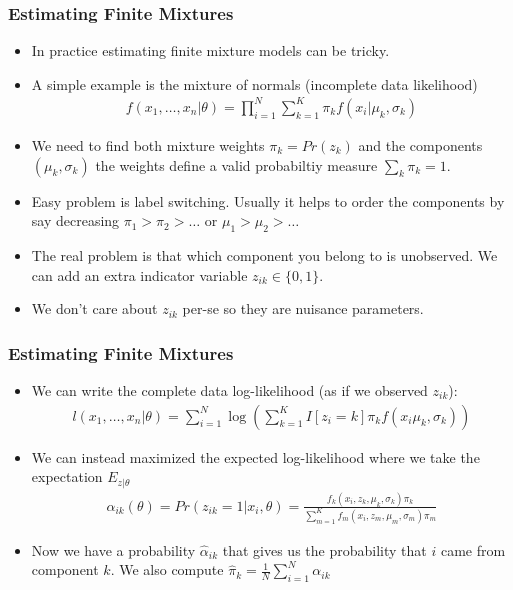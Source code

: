 \documentclass[xcolor=pdftex,dvipsnames,table,mathserif]{beamer}
\begin{document}
\begin{frame}
\frametitle{Estimating Finite Mixtures}
\begin{itemize}
\item In practice estimating finite mixture models can be tricky.
\item A simple example is the mixture of normals (incomplete data likelihood)
\begin{eqnarray*}
f(x_1,\ldots,x_n | \theta) = \prod_{i=1}^N \sum_{k=1}^K \pi_k f(x_i | \mu_k, \sigma_k)
\end{eqnarray*}
\item We need to find both mixture weights $\pi_k = Pr(z_k)$ and the components $(\mu_k,\sigma_k)$ the weights define a valid probabiltiy measure $\sum_k \pi_k = 1$.
\item Easy problem is \alert{label switching}. Usually it helps to order the components by say decreasing $\pi_1 > \pi_2 > \ldots$ or  $\mu_1 > \mu_2 > \ldots$ 
\item The real problem is that which component you belong to is unobserved. We can add an extra indicator variable $z_{ik} \in \{0,1\}$.
\item We don't care about $z_{ik}$ per-se so they are \alert{nuisance parameters}.
\end{itemize}
\end{frame}

\begin{frame}
\frametitle{Estimating Finite Mixtures}
\begin{itemize}
\item We can write the complete data log-likelihood (as if we observed $z_{ik}$):
\begin{eqnarray*}
l(x_1,\ldots,x_n | \theta) = \sum_{i=1}^N  \log \left( \sum_{k=1}^K I[z_i = k]  \pi_k f(x_i \mu_k, \sigma_k) \right)
\end{eqnarray*}
\item We can instead maximized the expected log-likelihood where we take the expectation $E_{z|\theta}$
\begin{eqnarray*}
\alpha_{ik}(\theta) = Pr(z_{ik} =1 | x_i,\theta) = \frac{f_k(x_i,z_k,\mu_k,\sigma_k) \pi_k }{\sum_{m=1}^K f_m(x_i,z_m,\mu_m,\sigma_m) \pi_m}
\end{eqnarray*}
\item Now we have a probability $\hat{\alpha}_{ik}$ that gives us the probability that $i$ came from component $k$. We also compute $\hat{\pi}_k = \frac{1}{N} \sum_{i=1}^N \alpha_{ik}$
\end{itemize}
\end{frame}
\end{document}
